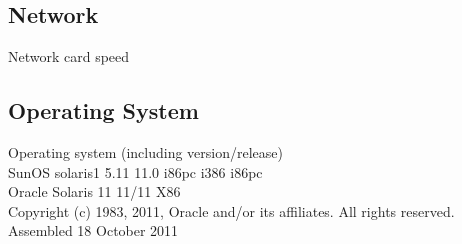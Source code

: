 \subsection{Network}
    Network card speed\\

\subsection{Operating System}
    Operating system (including version/release) \\
SunOS solaris1 5.11 11.0 i86pc i386 i86pc\\

                           Oracle Solaris 11 11/11 X86\\
  Copyright (c) 1983, 2011, Oracle and/or its affiliates.  All rights reserved.\\
                            Assembled 18 October 2011

